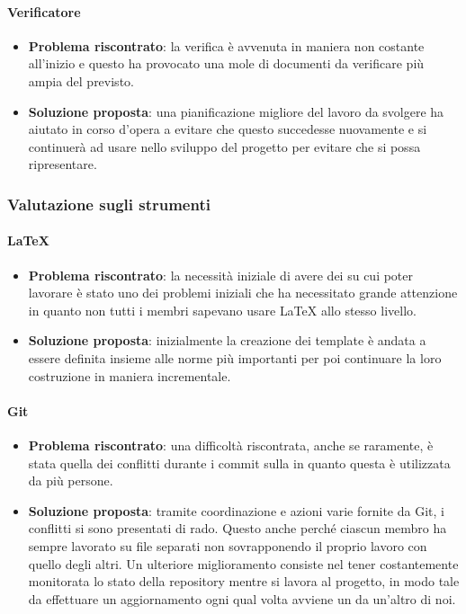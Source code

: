 		\paragraph{Verificatore}
			\begin{itemize}
				\item \textbf{Problema riscontrato}: la verifica è avvenuta in maniera non costante all'inizio e questo ha provocato una mole di documenti da verificare più ampia del previsto.
				\item \textbf{Soluzione proposta}: una pianificazione migliore del lavoro da svolgere ha aiutato in corso d'opera a evitare che questo succedesse nuovamente e si continuerà ad usare nello sviluppo del progetto per evitare che si possa ripresentare.
			\end{itemize}

	\subsubsection{Valutazione sugli strumenti}

		\paragraph{\LaTeX}
			\begin{itemize}
				\item \textbf{Problema riscontrato}: la necessità iniziale di avere dei  su cui poter lavorare è stato uno dei problemi iniziali che ha necessitato grande attenzione in quanto non tutti i membri sapevano usare {\LaTeX} allo stesso livello.
				\item \textbf{Soluzione proposta}: inizialmente la creazione dei template è andata a essere definita insieme alle norme più importanti per poi continuare la loro costruzione in maniera incrementale.
			\end{itemize}
		
		\paragraph{Git}
			\begin{itemize}
				\item \textbf{Problema riscontrato}: una difficoltà riscontrata, anche se raramente, è stata quella dei conflitti durante i commit sulla  in quanto questa è utilizzata da più persone.
				\item \textbf{Soluzione proposta}: tramite coordinazione e azioni varie fornite da Git, i conflitti si sono presentati di rado. Questo anche perché ciascun membro ha sempre lavorato su file separati non sovrapponendo il proprio lavoro con quello degli altri. Un ulteriore miglioramento consiste nel tener costantemente monitorata lo stato della repository mentre si lavora al progetto, in modo tale da effettuare un aggiornamento ogni qual volta avviene un  da un'altro di noi. 
			\end{itemize}
		
